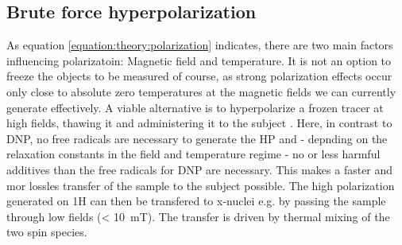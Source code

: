         \subsection{Brute force hyperpolarization}
        As equation \ref{equation:theory:polarization} indicates, there are two main factors influencing polarizatoin: Magnetic field and temperature. It is not an option to freeze the objects to be measured of course, as strong polarization effects occur only close to absolute zero temperatures at the magnetic fields we can currently generate effectively. A viable alternative is to hyperpolarize a frozen tracer at high fields, thawing it and administering it to the subject \cite{hirsch_brute-force_2015}. Here, in contrast to DNP, no free radicals are necessary to generate the HP and - depnding on the relaxation constants in the field and temperature regime - no or less harmful additives than the free radicals for DNP are necessary. This makes a faster and mor lossles transfer of the sample to the subject possible. The high polarization generated on 1H can then be transfered to x-nuclei e.g. by passing the sample through low fields (< \SI{10}{\milli\tesla}). The transfer is driven by thermal mixing \cite{goldman_overview_2008} of the two spin species.
